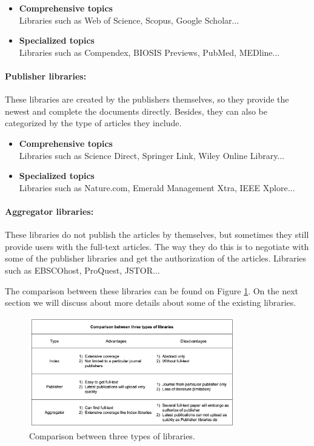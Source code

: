 	\begin{itemize}		
		\item\textbf{Comprehensive topics}\\Libraries such as Web of Science, Scopus, Google Scholar...
		\item\textbf{Specialized topics}\\Libraries such as Compendex, BIOSIS Previews, PubMed, MEDline...		
	\end{itemize}
	
\paragraph{Publisher libraries:}
	These libraries are created by the publishers themselves, so they provide the newest and complete the documents directly.
	Besides, they can also be categorized by the type of articles they include.
	
	\begin{itemize}		
		\item\textbf{Comprehensive topics}\\Libraries such as Science Direct, Springer Link, Wiley Online Library...
		\item\textbf{Specialized topics}\\Libraries such as Nature.com, Emerald Management Xtra, IEEE Xplore...	
	\end{itemize}
	
\paragraph{Aggregator libraries:}
	These libraries do not publish the articles by themselves, but sometimes they still provide users with the full-text articles.
	The way they do this is to negotiate with some of the publisher libraries and get the authorization of the articles.
	Libraries such as EBSCOhost, ProQuest, JSTOR...

	The comparison between these libraries can be found on Figure \ref{WBC1}.
	On the next section we will discuss about more details about some of the existing libraries.

\begin{figure}[htb]
	\begin{center}
		\includegraphics[width=0.8\textwidth]{Wolverine_Background_Chart_1}
	\end{center}
	\caption{Comparison between three types of libraries.\label{WBC1}}
\end{figure}
\newpage

